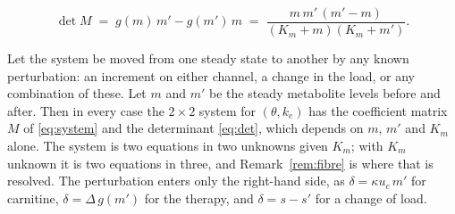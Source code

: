\begin{equation}
\det M \;=\; g(m)\,m' - g(m')\,m
\;=\; \frac{m\,m'\,(m' - m)}{(K_m + m)(K_m + m')} .
\label{eq:det}
\end{equation}

\begin{proposition}
\label{prop:channel}
Let the system be moved from one steady state to another by any known perturbation: an
increment on either channel, a change in the load, or any combination of these. Let $m$ and
$m'$ be the steady metabolite levels before and after. Then in every case the
$2 \times 2$ system for $(\theta, k_e)$ has the coefficient matrix $M$ of
\eqref{eq:system} and the determinant \eqref{eq:det}, which depends on $m$, $m'$ and $K_m$
alone. The system is two equations in two unknowns given $K_m$; with $K_m$ unknown it is two
equations in three, and Remark~\ref{rem:fibre} is where that is resolved. The perturbation enters only the right-hand side, as
$\delta = \kappa u_c\, m'$ for carnitine, $\delta = \Delta\, g(m')$ for the therapy, and
$\delta = s - s'$ for a change of load.
\end{proposition}

